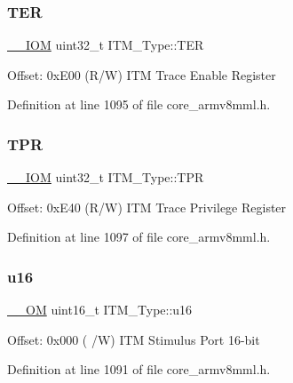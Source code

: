 \mbox{\label{struct_i_t_m___type_acd03c6858f7b678dab6a6121462e7807}} 
\subsubsection{\texorpdfstring{T\+ER}{TER}}
{\footnotesize\ttfamily \hyperlink{core__sc300_8h_ab6caba5853a60a17e8e04499b52bf691}{\+\_\+\+\_\+\+I\+OM} uint32\+\_\+t I\+T\+M\+\_\+\+Type\+::\+T\+ER}

Offset\+: 0x\+E00 (R/W) I\+TM Trace Enable Register 

Definition at line 1095 of file core\+\_\+armv8mml.\+h.

\mbox{\label{struct_i_t_m___type_ae907229ba50538bf370fbdfd54c099a2}} 
\subsubsection{\texorpdfstring{T\+PR}{TPR}}
{\footnotesize\ttfamily \hyperlink{core__sc300_8h_ab6caba5853a60a17e8e04499b52bf691}{\+\_\+\+\_\+\+I\+OM} uint32\+\_\+t I\+T\+M\+\_\+\+Type\+::\+T\+PR}

Offset\+: 0x\+E40 (R/W) I\+TM Trace Privilege Register 

Definition at line 1097 of file core\+\_\+armv8mml.\+h.

\mbox{\label{struct_i_t_m___type_a962a970dfd286cad7f8a8577e87d4ad3}} 
\subsubsection{\texorpdfstring{u16}{u16}}
{\footnotesize\ttfamily \hyperlink{core__sc300_8h_a0ea2009ed8fd9ef35b48708280fdb758}{\+\_\+\+\_\+\+OM} uint16\+\_\+t I\+T\+M\+\_\+\+Type\+::u16}

Offset\+: 0x000 ( /W) I\+TM Stimulus Port 16-\/bit 

Definition at line 1091 of file core\+\_\+armv8mml.\+h.

\mbox{\label{struct_i_t_m___type_a5834885903a557674f078f3b71fa8bc8}} 
